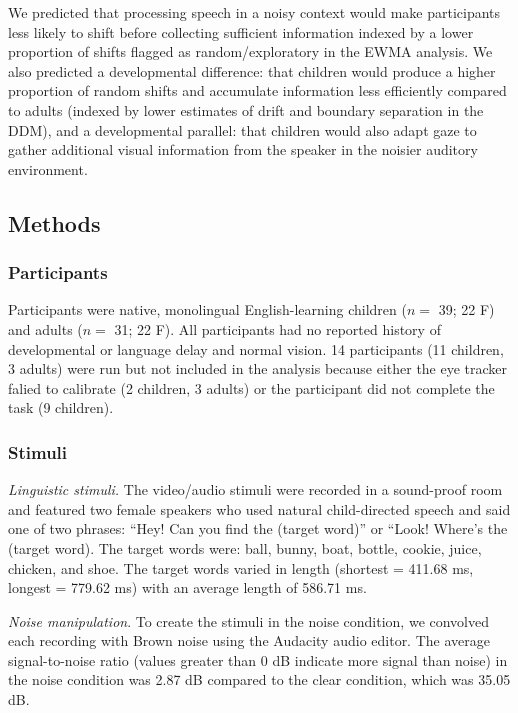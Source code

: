 \documentclass[,man,floatsintext]{apa6}
\begin{document}
We predicted that processing speech in a noisy context would make
participants less likely to shift before collecting sufficient
information indexed by a lower proportion of shifts flagged as
random/exploratory in the EWMA analysis. We also predicted a
developmental difference: that children would produce a higher
proportion of random shifts and accumulate information less efficiently
compared to adults (indexed by lower estimates of drift and boundary
separation in the DDM), and a developmental parallel: that children
would also adapt gaze to gather additional visual information from the
speaker in the noisier auditory environment.

\subsection{Methods}\label{methods-1}

\subsubsection{Participants}\label{participants-1}

Participants were native, monolingual English-learning children (\(n=\)
39; 22 F) and adults (\(n=\) 31; 22 F). All participants had no reported
history of developmental or language delay and normal vision. 14
participants (11 children, 3 adults) were run but not included in the
analysis because either the eye tracker falied to calibrate (2 children,
3 adults) or the participant did not complete the task (9 children).

\subsubsection{Stimuli}\label{stimuli-1}

\emph{Linguistic stimuli.} The video/audio stimuli were recorded in a
sound-proof room and featured two female speakers who used natural
child-directed speech and said one of two phrases: \enquote{Hey! Can you
find the (target word)} or ``Look! Where's the (target word). The target
words were: ball, bunny, boat, bottle, cookie, juice, chicken, and shoe.
The target words varied in length (shortest = 411.68 ms, longest =
779.62 ms) with an average length of 586.71 ms.

\emph{Noise manipulation}. To create the stimuli in the noise condition,
we convolved each recording with Brown noise using the Audacity audio
editor. The average signal-to-noise ratio (values greater than 0 dB
indicate more signal than noise) in the noise condition was 2.87 dB
compared to the clear condition, which was 35.05 dB.
\end{document}
